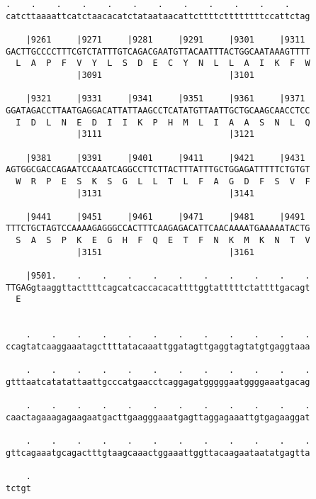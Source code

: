 \documentclass{article}
\begin{document}
\begin{Verbatim}
.    .    .    .    .    .    .    .    .    .    .    .    
catcttaaaattcatctaacacatctataataacattcttttcttttttttccattctag
                                                            
    |9261     |9271     |9281     |9291     |9301     |9311 
GACTTGCCCCTTTCGTCTATTTGTCAGACGAATGTTACAATTTACTGGCAATAAAGTTTT
  L  A  P  F  V  Y  L  S  D  E  C  Y  N  L  L  A  I  K  F  W
              |3091                         |3101           
  
    |9321     |9331     |9341     |9351     |9361     |9371 
GGATAGACCTTAATGAGGACATTATTAAGCCTCATATGTTAATTGCTGCAAGCAACCTCC
  I  D  L  N  E  D  I  I  K  P  H  M  L  I  A  A  S  N  L  Q
              |3111                         |3121           
  
    |9381     |9391     |9401     |9411     |9421     |9431 
AGTGGCGACCAGAATCCAAATCAGGCCTTCTTACTTTATTTGCTGGAGATTTTTCTGTGT
  W  R  P  E  S  K  S  G  L  L  T  L  F  A  G  D  F  S  V  F
              |3131                         |3141           
  
    |9441     |9451     |9461     |9471     |9481     |9491 
TTTCTGCTAGTCCAAAAGAGGGCCACTTTCAAGAGACATTCAACAAAATGAAAAATACTG
  S  A  S  P  K  E  G  H  F  Q  E  T  F  N  K  M  K  N  T  V
              |3151                         |3161           
  
    |9501.    .    .    .    .    .    .    .    .    .    .
TTGAGgtaaggttacttttcagcatcaccacacattttggtatttttctattttgacagt
  E                                                         
                                                            
  
    .    .    .    .    .    .    .    .    .    .    .    .
ccagtatcaaggaaatagcttttatacaaattggatagttgaggtagtatgtgaggtaaa
                                                            
    .    .    .    .    .    .    .    .    .    .    .    .
gtttaatcatatattaattgcccatgaacctcaggagatgggggaatggggaaatgacag
                                                            
    .    .    .    .    .    .    .    .    .    .    .    .
caactagaaagagaagaatgacttgaagggaaatgagttaggagaaattgtgagaaggat
                                                            
    .    .    .    .    .    .    .    .    .    .    .    .
gttcagaaatgcagactttgtaagcaaactggaaattggttacaagaataatatgagtta
                                                            
    .
tctgt
     

\end{Verbatim}
\end{document}
